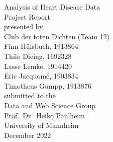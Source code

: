 \documentclass[11pt,titlepage,oneside,openany]{article}
\begin{document}
\begin{titlepage}
	\vspace*{2cm}
  \begin{center}
   {\Large Analysis of Heart Disease Data\\}
   \vspace{2cm} 
   {Project Report\\}
   \vspace{2cm}
   {presented by\\
   	Club der toten Dichten (Team 12)\\
    Finn Hülsbuch, 1913864 \\
    Thilo Dieing, 1692328 \\
    Lasse Lemke, 1914420 \\
    Eric Jacquomé, 1903834 \\
    Timotheus Gumpp, 1913876 \\
   }
   \vspace{1cm} 
   {submitted to the\\
    Data and Web Science Group\\
    Prof.\ Dr.\ Heiko Paulheim\\
    University of Mannheim\\} \vspace{2cm}
   {December 2022}
  \end{center}
\end{titlepage} 

\tableofcontents





\newpage












\newpage
\printbibliography


\pagestyle{plain}
\end{document}
